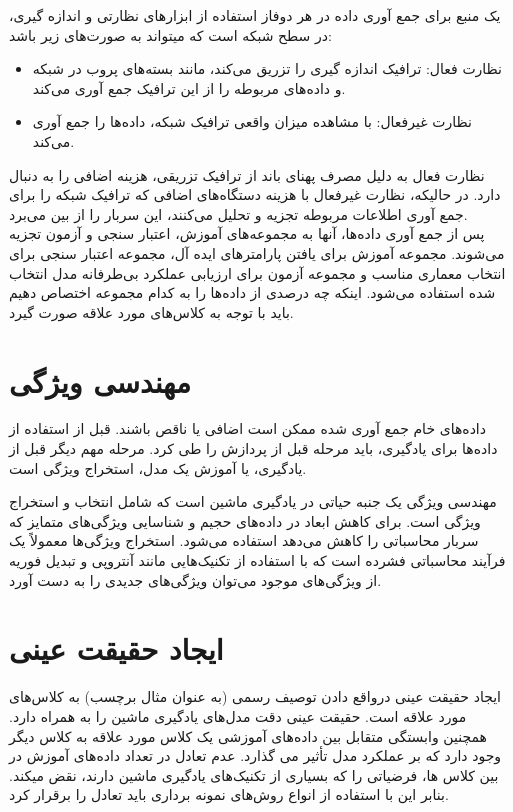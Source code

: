 یک منبع برای جمع آوری داده در هر دوفاز استفاده از ابزارهای نظارتی و اندازه گیری، در سطح شبکه است که میتواند به صورت‌های زیر باشد:

\begin{itemize}
\item نظارت فعال: ترافیک اندازه گیری را تزریق می‌کند، مانند بسته‌های پروب  در شبکه و داده‌های مربوطه را از این ترافیک جمع آوری می‌کند.
\item نظارت غیرفعال: با مشاهده میزان واقعی ترافیک شبکه، داده‌ها را جمع آوری می‌کند.
\end{itemize}

نظارت فعال به دلیل مصرف پهنای باند از ترافیک تزریقی، هزینه اضافی را به دنبال دارد. در حالیکه، نظارت غیرفعال با هزینه دستگاه‌های اضافی که ترافیک شبکه را برای جمع آوری اطلاعات مربوطه تجزیه و تحلیل می‌کنند، این سربار را از بین می‌برد\cite{ boutaba2018comprehensive}.
\\
پس از جمع آوری داده‌ها، آنها به مجموعه‌های آموزش، اعتبار سنجی و آزمون تجزیه می‌شوند. مجموعه آموزش برای یافتن پارامترهای ایده آل، مجموعه اعتبار سنجی برای انتخاب معماری مناسب و مجموعه آزمون برای ارزیابی عملکرد بی‌طرفانه مدل انتخاب شده استفاده می‌شود. اینکه چه درصدی از داده‌ها را به کدام مجموعه اختصاص دهیم باید با توجه به کلاس‌های مورد علاقه صورت گیرد.
\newpage

\section{مهندسی ویژگی}



داده‌های خام جمع آوری شده ممکن است اضافی یا ناقص باشند. قبل از استفاده از داده‌ها برای یادگیری، باید مرحله قبل از پردازش را طی کرد. مرحله مهم دیگر قبل از یادگیری، یا آموزش یک مدل، استخراج ویژگی است.


مهندسی ویژگی یک جنبه حیاتی در یادگیری ماشین است که شامل انتخاب و استخراج ویژگی است. برای کاهش ابعاد در داده‌های حجیم و شناسایی ویژگی‌های متمایز که سربار محاسباتی را کاهش می‌دهد استفاده می‌شود. استخراج ویژگی‌ها معمولاً یک فرآیند محاسباتی فشرده است که با استفاده از تکنیک‌هایی مانند آنتروپی و تبدیل فوریه از ویژگی‌های موجود می‌توان ویژگی‌های جدیدی را به دست آورد\cite{ boutaba2018comprehensive}.


\section{ایجاد حقیقت عینی}


ایجاد حقیقت عینی درواقع دادن توصیف رسمی (به عنوان مثال برچسب) به کلاس‌های مورد علاقه است. حقیقت عینی دقت مدل‌های یادگیری ماشین را به همراه دارد. همچنین وابستگی متقابل بین داده‌های آموزشی یک کلاس مورد علاقه به کلاس دیگر وجود دارد که بر عملکرد مدل تأثیر می گذارد. عدم تعادل در تعداد داده‌های آموزش در بین کلاس ها، فرضیاتی را که بسیاری از تکنیک‌های یادگیری ماشین دارند، نقض میکند. بنابر این با استفاده از انواع روش‌های نمونه برداری باید تعادل را برقرار کرد\cite{ boutaba2018comprehensive}.



